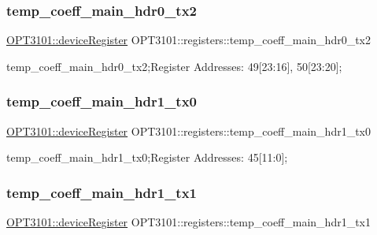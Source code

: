 \subsubsection{\texorpdfstring{temp\+\_\+coeff\+\_\+main\+\_\+hdr0\+\_\+tx2}{temp\_coeff\_main\_hdr0\_tx2}}
{\footnotesize\ttfamily \mbox{\hyperlink{class_o_p_t3101_1_1device_register}{O\+P\+T3101\+::device\+Register}} O\+P\+T3101\+::registers\+::temp\+\_\+coeff\+\_\+main\+\_\+hdr0\+\_\+tx2}



temp\+\_\+coeff\+\_\+main\+\_\+hdr0\+\_\+tx2;Register Addresses\+: 49\mbox{[}23\+:16\mbox{]}, 50\mbox{[}23\+:20\mbox{]}; 

\mbox{\label{class_o_p_t3101_1_1registers_aa6168acee7052f09cb874ecd4480b697}} 
\subsubsection{\texorpdfstring{temp\+\_\+coeff\+\_\+main\+\_\+hdr1\+\_\+tx0}{temp\_coeff\_main\_hdr1\_tx0}}
{\footnotesize\ttfamily \mbox{\hyperlink{class_o_p_t3101_1_1device_register}{O\+P\+T3101\+::device\+Register}} O\+P\+T3101\+::registers\+::temp\+\_\+coeff\+\_\+main\+\_\+hdr1\+\_\+tx0}



temp\+\_\+coeff\+\_\+main\+\_\+hdr1\+\_\+tx0;Register Addresses\+: 45\mbox{[}11\+:0\mbox{]}; 

\mbox{\label{class_o_p_t3101_1_1registers_a59dcda2fcbc9a2faa4b62e1c982578c3}} 
\subsubsection{\texorpdfstring{temp\+\_\+coeff\+\_\+main\+\_\+hdr1\+\_\+tx1}{temp\_coeff\_main\_hdr1\_tx1}}
{\footnotesize\ttfamily \mbox{\hyperlink{class_o_p_t3101_1_1device_register}{O\+P\+T3101\+::device\+Register}} O\+P\+T3101\+::registers\+::temp\+\_\+coeff\+\_\+main\+\_\+hdr1\+\_\+tx1}



